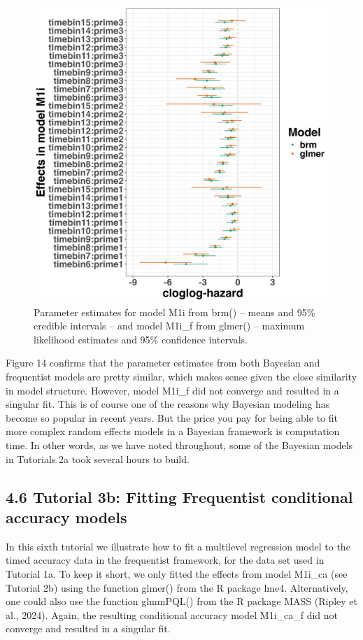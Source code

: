 \documentclass[
  man, donotrepeattitle,floatsintext]{apa6}
\begin{document}
\begin{figure}[H]

{\centering \includegraphics[width=0.8\linewidth,height=0.67\textheight,]{../Tutorial_3_Frequentist/comparison} 

}

\caption{Parameter estimates for model M1i from brm() -- means and 95\% credible intervals -- and model M1i\_f from glmer() -- maximum likelihood estimates and 95\% confidence intervals.}\label{fig:plot-comparison}
\end{figure}

Figure 14 confirms that the parameter estimates from both Bayesian and frequentist models are pretty similar, which makes sense given the close similarity in model structure. However, model M1i\_f did not converge and resulted in a singular fit. This is of course one of the reasons why Bayesian modeling has become so popular in recent years. But the price you pay for being able to fit more complex random effects models in a Bayesian framework is computation time. In other words, as we have noted throughout, some of the Bayesian models in Tutorials 2a took several hours to build.

\subsection{4.6 Tutorial 3b: Fitting Frequentist conditional accuracy models}\label{tutorial-3b-fitting-frequentist-conditional-accuracy-models}

In this sixth tutorial we illustrate how to fit a multilevel regression model to the timed accuracy data in the frequentist framework, for the data set used in Tutorial 1a. To keep it short, we only fitted the effects from model M1i\_ca (see Tutorial 2b) using the function glmer() from the R package lme4. Alternatively, one could also use the function glmmPQL() from the R package MASS (Ripley et al., 2024). Again, the resulting conditional accuracy model M1i\_ca\_f did not converge and resulted in a singular fit.
\end{document}
